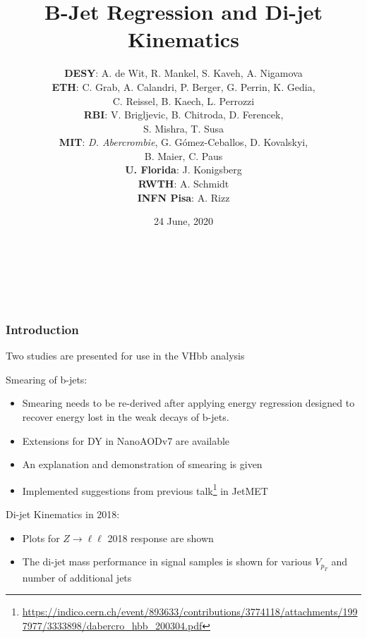 \documentclass{beamer}
\author[D. Abercrombie]{
  {\bf DESY}: A. de Wit, R. Mankel, S. Kaveh, A. Nigamova \\
  \vfill
  {\bf ETH}: C. Grab, A. Calandri, P. Berger, G. Perrin, K. Gedia, \\ C. Reissel, B. Kaech, L. Perrozzi \\
  \vfill
  {\bf RBI}: V. Brigljevic, B. Chitroda, D. Ferencek, \\ S. Mishra, T. Susa \\
  \vfill
  {\bf MIT}: \emph{D. Abercrombie}, G. G\'omez-Ceballos, D. Kovalskyi, \\ B. Maier, C. Paus \\
  \vfill
  {\bf U. Florida}: J. Konigsberg \\
  \vfill
  {\bf RWTH}: A. Schmidt \\
  \vfill
  {\bf INFN Pisa}: A. Rizz
}
\title{\bf \sffamily B-Jet Regression and Di-jet Kinematics}
\date{24 June, 2020}
\begin{document}
\begin{frame}
  \begin{center}
  \inserttitle \\
  \end{center}
  \vfill
  \insertauthor \\
  \vfill
  \begin{center}
  \insertdate
  \end{center}
\end{frame}

\begin{frame}
  \frametitle{Introduction}

  Two studies are presented for use in the VHbb analysis

  \vfill

  Smearing of b-jets:
  \begin{itemize}
  \item Smearing needs to be re-derived after applying
    energy regression designed to recover energy
    lost in the weak decays of b-jets.
  \item Extensions for DY in NanoAODv7 are available
  \item An explanation and demonstration of smearing is given
  \item Implemented suggestions from previous talk\footnote{\url{https://indico.cern.ch/event/893633/contributions/3774118/attachments/1997977/3333898/dabercro_hbb_200304.pdf}} in JetMET
  \end{itemize}

  Di-jet Kinematics in 2018:
  \begin{itemize}
  \item Plots for $Z\rightarrow \ell\ell$ 2018 response are shown
  \item The di-jet mass performance in signal samples is shown
    for various $V_{p_T}$ and number of additional jets
  \end{itemize}

\end{frame}
\end{document}
